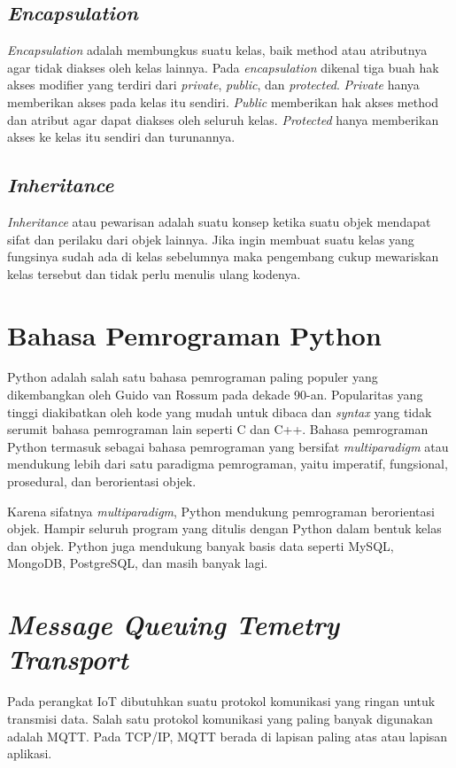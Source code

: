 	\subsection{\textit{Encapsulation}}
	\textit{Encapsulation} adalah membungkus suatu kelas, baik method atau atributnya agar tidak diakses oleh kelas lainnya. Pada \textit{encapsulation} dikenal tiga buah hak akses modifier yang terdiri dari \textit{private}, \textit{public}, dan \textit{protected}. \textit{Private} hanya memberikan akses pada kelas itu sendiri. \textit{Public} memberikan hak akses method dan atribut agar dapat diakses oleh seluruh kelas. \textit{Protected} hanya memberikan akses ke kelas itu sendiri dan turunannya.

	\subsection{\textit{Inheritance}}
	\textit{Inheritance} atau pewarisan adalah suatu konsep ketika suatu objek mendapat sifat dan perilaku dari objek lainnya. Jika ingin membuat suatu kelas yang fungsinya sudah ada di kelas sebelumnya maka pengembang cukup mewariskan kelas tersebut dan tidak perlu menulis ulang kodenya.
	
\section{Bahasa Pemrograman Python}
Python adalah salah satu bahasa pemrograman paling populer yang dikembangkan oleh Guido van Rossum pada dekade 90-an. Popularitas yang tinggi diakibatkan oleh kode yang mudah untuk dibaca dan \textit{syntax} yang tidak serumit bahasa pemrograman lain seperti C dan C++. Bahasa pemrograman Python termasuk sebagai bahasa pemrograman yang bersifat \textit{multiparadigm} atau mendukung lebih dari satu paradigma pemrograman, yaitu imperatif, fungsional, prosedural, dan berorientasi objek.

Karena sifatnya \textit{multiparadigm}, Python mendukung pemrograman berorientasi objek. Hampir seluruh program yang ditulis dengan Python dalam bentuk kelas dan objek. Python juga mendukung banyak basis data seperti MySQL, MongoDB, PostgreSQL, dan masih banyak lagi.


\section{\textit{Message Queuing Temetry Transport}}
Pada perangkat IoT dibutuhkan suatu protokol komunikasi yang ringan untuk transmisi data. Salah satu protokol komunikasi yang paling banyak digunakan adalah MQTT. Pada TCP/IP, MQTT berada di lapisan paling atas atau lapisan aplikasi. 

